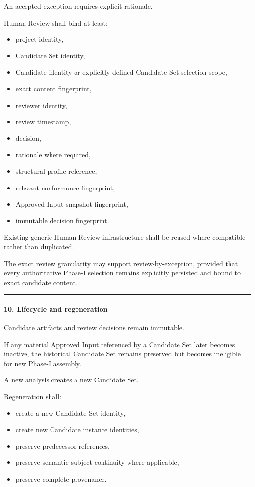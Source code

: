An accepted exception requires explicit rationale.

Human Review shall bind at least:

\begin{itemize}
\tightlist
\item
  project identity,
\item
  Candidate Set identity,
\item
  Candidate identity or explicitly defined Candidate Set selection scope,
\item
  exact content fingerprint,
\item
  reviewer identity,
\item
  review timestamp,
\item
  decision,
\item
  rationale where required,
\item
  structural-profile reference,
\item
  relevant conformance fingerprint,
\item
  Approved-Input snapshot fingerprint,
\item
  immutable decision fingerprint.
\end{itemize}

Existing generic Human Review infrastructure shall be reused where compatible rather than duplicated.

The exact review granularity may support review-by-exception, provided that every authoritative Phase-I selection remains explicitly persisted and bound to exact candidate content.

\begin{center}\rule{0.5\linewidth}{0.5pt}\end{center}

\hypertarget{10-lifecycle-and-regeneration}{%
\paragraph{10. Lifecycle and regeneration}\label{10-lifecycle-and-regeneration}}

Candidate artifacts and review decisions remain immutable.

If any material Approved Input referenced by a Candidate Set later becomes inactive, the historical Candidate Set remains preserved but becomes ineligible for new Phase-I assembly.

A new analysis creates a new Candidate Set.

Regeneration shall:

\begin{itemize}
\tightlist
\item
  create a new Candidate Set identity,
\item
  create new Candidate instance identities,
\item
  preserve predecessor references,
\item
  preserve semantic subject continuity where applicable,
\item
  preserve complete provenance.
\end{itemize}

